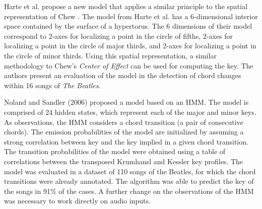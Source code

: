
Harte et al. \parencite{harte2006detecting} propose a new
model that applies a similar principle to the spatial
representation of Chew \parencite{chew2000towards}. The
model from Harte et al. has a 6-dimensional interior space
contained by the surface of a hypertorus. The 6 dimensions
of their model correspond to 2-axes for localizing a point
in the circle of fifths, 2-axes for localizing a point in
the circle of major thirds, and 2-axes for localizing a
point in the circle of minor thirds. Using this spatial
representation, a similar methodology to Chew's \emph{Center
of Effect} can be used for computing the key. The authors
present an evaluation of the model in the detection of chord
changes within 16 songs of \emph{The Beatles}.



Noland and Sandler (2006) proposed a model based on an HMM.
The model is comprised of 24 hidden states, which represent
each of the major and minor keys. As observations, the HMM
considers a chord transition (a pair of consecutive chords).
The emission probabilities of the model are initialized by
assuming a strong correlation between key and the key
implied in a given chord transition. The transition
probabilities of the model were obtained using a table of
correlations between the transposed Krumhansl and Kessler
key profiles. The model was evaluated in a dataset of 110
songs of the Beatles, for which the chord transitions were
already annotated. The algorithm was able to predict the key
of the songs in 91\% of the cases. A further change on the
observations of the HMM was necessary to work directly on
audio inputs.

